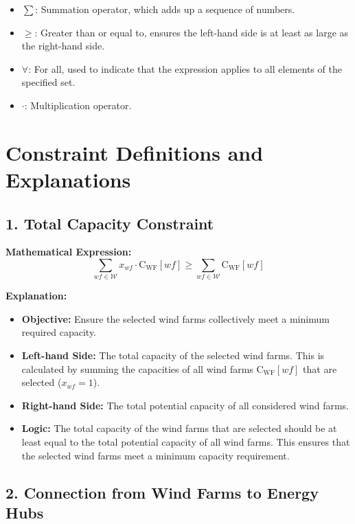 \begin{itemize}
    \item \( \sum \): Summation operator, which adds up a sequence of numbers.
    \item \( \geq \): Greater than or equal to, ensures the left-hand side is at least as large as the right-hand side.
    \item \( \forall \): For all, used to indicate that the expression applies to all elements of the specified set.
    \item \( \cdot \): Multiplication operator.
\end{itemize}

\section*{Constraint Definitions and Explanations}

\subsection*{1. Total Capacity Constraint}

\textbf{Mathematical Expression:}
\[
\sum_{wf \in \mathcal{W}} x_{wf} \cdot \text{C}_{\text{WF}}[wf] \geq \sum_{wf \in \mathcal{W}} \text{C}_{\text{WF}}[wf]
\]

\textbf{Explanation:}
\begin{itemize}
    \item \textbf{Objective:} Ensure the selected wind farms collectively meet a minimum required capacity.
    \item \textbf{Left-hand Side:} The total capacity of the selected wind farms. This is calculated by summing the capacities of all wind farms \( \text{C}_{\text{WF}}[wf] \) that are selected (\( x_{wf} = 1 \)).
    \item \textbf{Right-hand Side:} The total potential capacity of all considered wind farms.
    \item \textbf{Logic:} The total capacity of the wind farms that are selected should be at least equal to the total potential capacity of all wind farms. This ensures that the selected wind farms meet a minimum capacity requirement.
\end{itemize}

\subsection*{2. Connection from Wind Farms to Energy Hubs}

